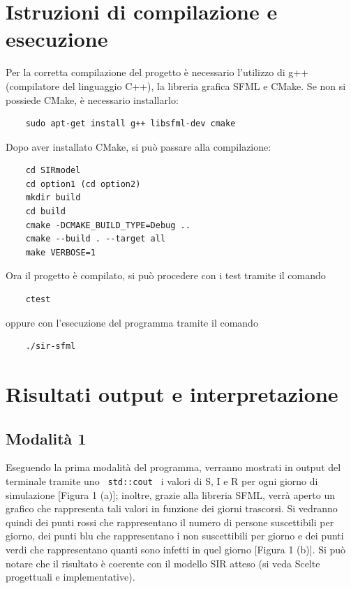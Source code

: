 \documentclass[a4paper,10 pt]{article}
\begin{document}
\section{Istruzioni di compilazione e esecuzione}


Per la corretta compilazione del progetto è necessario l'utilizzo di g++ (compilatore del linguaggio C++), la libreria grafica SFML e CMake. 
Se non si possiede CMake, è necessario installarlo:
\begin{lstlisting}
	sudo apt-get install g++ libsfml-dev cmake
\end{lstlisting}
Dopo aver installato CMake, si può passare alla compilazione:
\begin{lstlisting}
	cd SIRmodel
	cd option1 (cd option2)
	mkdir build
	cd build
	cmake -DCMAKE_BUILD_TYPE=Debug ..
	cmake --build . --target all
	make VERBOSE=1 
\end{lstlisting}
Ora il progetto è compilato, si può procedere con i test tramite il comando
\begin{lstlisting}
	ctest
\end{lstlisting}
oppure con l'esecuzione del programma tramite il comando
\begin{lstlisting}
	./sir-sfml
\end{lstlisting}
\section{Risultati output e interpretazione}
\subsection{Modalità 1}
Eseguendo la prima modalità del programma, verranno mostrati in output del terminale tramite uno  \verb! std::cout ! i valori di S, I e R per ogni giorno di simulazione [Figura 1 (a)]; inoltre, grazie alla libreria SFML, verrà aperto un grafico che rappresenta tali valori in funzione dei giorni trascorsi. Si vedranno quindi dei punti rossi che rappresentano il numero di persone suscettibili per giorno, dei punti blu che rappresentano i non suscettibili per giorno e dei punti verdi che rappresentano quanti sono infetti in quel giorno [Figura 1 (b)]. Si può notare che il risultato è coerente con il modello SIR atteso (si veda Scelte progettuali e implementative).
\end{document}
